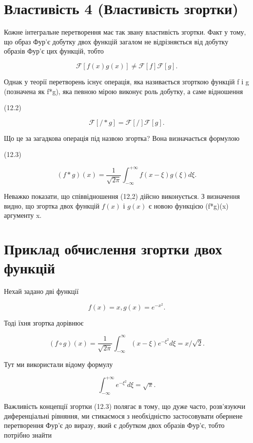 \documentclass[
  ukrainian,
]{article}
\begin{document}
\section{Властивість 4 (Властивість
згортки)}\label{ux432ux43bux430ux441ux442ux438ux432ux456ux441ux442ux44c-4-ux432ux43bux430ux441ux442ux438ux432ux456ux441ux442ux44c-ux437ux433ux43eux440ux442ux43aux438}

Кожне інтегральне перетворення має так звану властивість згортки. Факт у
тому, що образ Фур'є добутку двох функцій загалом не відрізняється від
добутку образів Фур'є цих функцій, тобто

\[
\mathcal{F}[f(x)g(x)] \neq \mathcal{F}[f]\mathcal{F}[g].
\]

Однак у теорії перетворень існує операція, яка називається згорткою
функцій f і g (позначена як f*g), яка певною мірою виконує роль добутку,
а саме відношення

(12.2)

\[
\mathcal{F}[/*g] = \mathcal{F}[/]\mathcal{F}[g].
\]

Що це за загадкова операція під назвою згортка? Вона визначається
формулою

(12.3)

\[
(f*g)(x) = \frac{1}{\sqrt{2\pi}} \int_{-\infty}^{+\infty} f(x-\xi) g(\xi) d\xi.
\]

Неважко показати, що співвідношення (12,2) дійсно виконується. З
визначення видно, що згортка двох функцій \(f(x)\) і \(g(x)\) є новою
функцією (f*g)(x) аргументу x.

\section{Приклад обчислення згортки двох
функцій}\label{ux43fux440ux438ux43aux43bux430ux434-ux43eux431ux447ux438ux441ux43bux435ux43dux43dux44f-ux437ux433ux43eux440ux442ux43aux438-ux434ux432ux43eux445-ux444ux443ux43dux43aux446ux456ux439}

Нехай задано дві функції

\[
f(x) = x,
g(x) = e^{-x^2}.
\]

Тоді їхня згортка дорівнює

\[
(f \circ g)(x) = \frac{1}{\sqrt{2\pi}} \int_{-\infty}^{\infty} (x - \xi) e^{-\xi^2} d\xi = x/\sqrt{2}.
\]

Тут ми використали відому формулу

\[
\int_{-\infty}^{+\infty} e^{-\xi^2} d\xi = \sqrt{\pi}.
\]

Важливість концепції згортки (12.3) полягає в тому, що дуже часто,
розв'язуючи диференціальні рівняння, ми стикаємося з необхідністю
застосовувати обернене перетворення Фур'є до виразу, який є добутком
двох образів Фур'є, тобто потрібно знайти
\end{document}
